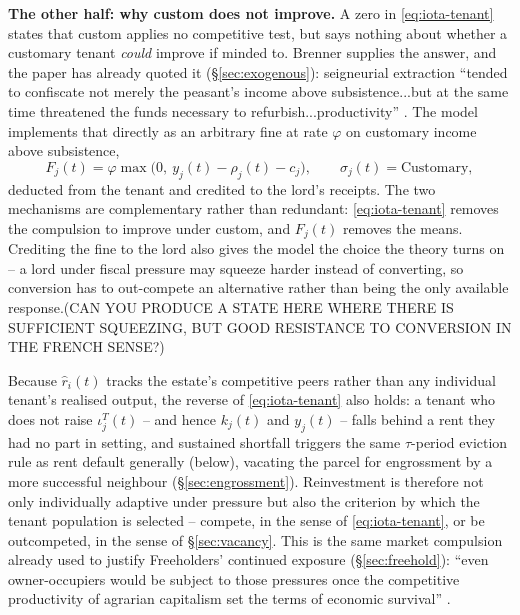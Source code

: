 \documentclass[11pt,english]{article}
\begin{document}
\textbf{The other half: why custom does not improve.} A zero in \eqref{eq:iota-tenant} states that custom applies no competitive test, but says nothing about whether a customary tenant \emph{could} improve if minded to. Brenner supplies the answer, and the paper has already quoted it (\S\ref{sec:exogenous}): seigneurial extraction ``tended to confiscate not merely the peasant's income above subsistence...but at the same time threatened the funds necessary to refurbish...productivity'' \cite[p.48]{brenner1976agrarian}. The model implements that directly as an arbitrary fine at rate $\varphi$ on customary income above subsistence,
\begin{equation}
F_j(t) = \varphi \max\!\big(0,\ y_j(t)-\rho_j(t)-c_j\big), \qquad \sigma_j(t)=\text{Customary},
\end{equation}
deducted from the tenant and credited to the lord's receipts. The two mechanisms are complementary rather than redundant: \eqref{eq:iota-tenant} removes the compulsion to improve under custom, and $F_j(t)$ removes the means. Crediting the fine to the lord also gives the model the choice the theory turns on -- a lord under fiscal pressure may squeeze harder instead of converting, so conversion has to out-compete an alternative rather than being the only available response.(CAN YOU PRODUCE A STATE HERE WHERE THERE IS SUFFICIENT SQUEEZING, BUT GOOD RESISTANCE TO CONVERSION IN THE FRENCH SENSE?)

Because $\hat r_i(t)$ tracks the estate's competitive peers rather than any individual tenant's realised output, the reverse of \eqref{eq:iota-tenant} also holds: a tenant who does not raise $\iota_j^{T}(t)$ -- and hence $k_j(t)$ and $y_j(t)$ -- falls behind a rent they had no part in setting, and sustained shortfall triggers the same $\tau$-period eviction rule as rent default generally (below), vacating the parcel for engrossment by a more successful neighbour (\S\ref{sec:engrossment}). Reinvestment is therefore not only individually adaptive under pressure but also the criterion by which the tenant population is selected -- compete, in the sense of \eqref{eq:iota-tenant}, or be outcompeted, in the sense of \S\ref{sec:vacancy}. This is the same market compulsion already used to justify Freeholders' continued exposure (\S\ref{sec:freehold}): ``even owner-occupiers would be subject to those pressures once the competitive productivity of agrarian capitalism set the terms of economic survival'' \cite[p.54]{wood2002origin}.
\end{document}
